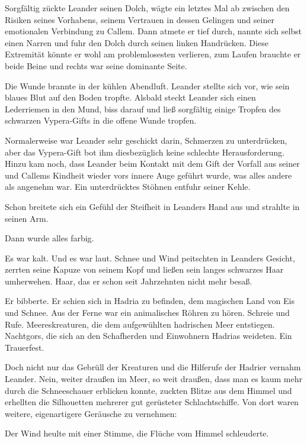 Sorgfältig zückte Leander seinen Dolch, wägte ein letztes Mal ab zwischen den Risiken seines Vorhabens, seinem Vertrauen in dessen Gelingen und seiner emotionalen Verbindung zu Callem. Dann atmete er tief durch, nannte sich selbst einen Narren und fuhr den Dolch durch seinen linken Handrücken. Diese Extremität könnte er wohl am problemlosesten verlieren, zum Laufen brauchte er beide Beine und rechts war seine dominante Seite.

Die Wunde brannte in der kühlen Abendluft. Leander stellte sich vor, wie sein blaues Blut auf den Boden tropfte. Alsbald steckt Leander sich einen Lederriemen in den Mund, biss darauf und ließ sorgfältig einige Tropfen des schwarzen Vypera-Gifts in die offene Wunde tropfen.

Normalerweise war Leander sehr geschickt darin, Schmerzen zu unterdrücken, aber das Vypera-Gift bot ihm diesbezüglich keine schlechte Herausforderung. Hinzu kam noch, dass Leander beim Kontakt mit dem Gift der Vorfall aus seiner und Callems Kindheit wieder vors innere Auge geführt wurde, was alles andere als angenehm war. Ein unterdrücktes Stöhnen entfuhr seiner Kehle.

Schon breitete sich ein Gefühl der Steifheit in Leanders Hand aus und strahlte in seinen Arm.

Dann wurde alles farbig.\bigskip







Es war kalt. Und es war laut. Schnee und Wind peitschten in Leanders Gesicht, zerrten seine Kapuze von seinem Kopf und ließen sein langes schwarzes Haar umherwehen. Haar, das er schon seit Jahrzehnten nicht mehr besaß.

Er bibberte. Er schien sich in Hadria zu befinden, dem magischen Land von Eis und Schnee. Aus der Ferne war ein animalisches Röhren zu hören. Schreie und Rufe. Meereskreaturen, die dem aufgewühlten hadrischen Meer entstiegen. Nachtgors, die sich an den Schafherden und Einwohnern Hadrias weideten. Ein Trauerfest.

Doch nicht nur das Gebrüll der Kreaturen und die Hilferufe der Hadrier vernahm Leander. Nein, weiter draußen im Meer, so weit draußen, dass man es kaum mehr durch die Schneeschauer erblicken konnte, zuckten Blitze aus dem Himmel und erhellten die Silhouetten mehrerer gut gerüsteter Schlachtschiffe. Von dort waren weitere, eigenartigere Geräusche zu vernehmen:

Der Wind heulte mit einer Stimme, die Flüche vom Himmel schleuderte.

